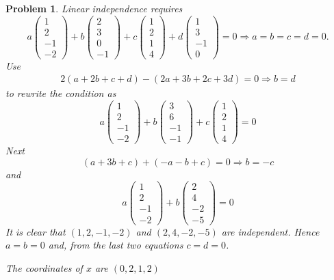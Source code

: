 \documentclass{article}
\theoremstyle{pprop}
\newtheorem{problem}{Problem}[section]
\begin{document}
\begin{problem}
Linear independence requires  
$$
a\begin{pmatrix}1 \\ 2 \\-1\\-2\end{pmatrix}
+
b\begin{pmatrix}2 \\ 3 \\0\\-1\end{pmatrix}
+
c\begin{pmatrix}1 \\ 2 \\1\\4\end{pmatrix}
+d\begin{pmatrix}1 \\ 3 \\-1\\0\end{pmatrix}=0
\Rightarrow a=b=c=d=0.
$$  
Use
\begin{align*}
2(a+2b+c+d)-(2a+3b+2c+3d)=0\Rightarrow b=d
\end{align*}
to rewrite the condition as
$$
a\begin{pmatrix}1 \\ 2 \\-1\\-2\end{pmatrix}
+
b\begin{pmatrix}3 \\ 6 \\-1\\-1\end{pmatrix}
+
c\begin{pmatrix}1 \\ 2 \\1\\4\end{pmatrix}
=0
$$
Next
$$
(a+3b+c)+(-a-b+c)=0\Rightarrow b=-c
$$
and 
$$
a\begin{pmatrix}1 \\ 2 \\-1\\-2\end{pmatrix}
+
b\begin{pmatrix}2 \\ 4 \\-2\\-5\end{pmatrix}
=0
$$
It is clear that $(1,2,-1,-2)$ and $(2,4,-2,-5)$ are independent.
Hence $a=b=0$ and, from the last two equations $c=d=0$.

The coordinates of $x$ are $(0,2,1,2)$
\end{problem}
\end{document}
